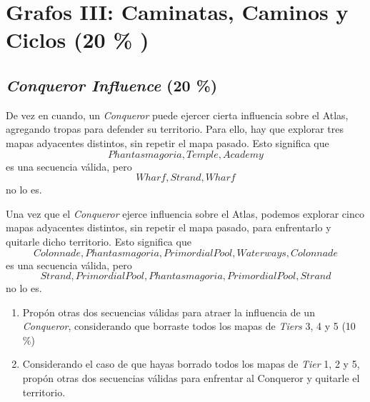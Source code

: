 \documentclass{article}
\begin{document}
\pagebreak

\section{Grafos III: Caminatas, Caminos y Ciclos (20 \% )}

\subsection{\textit{Conqueror Influence} (20 \%)}

De vez en cuando, un \textit{Conqueror} puede ejercer cierta influencia sobre el Atlas, agregando tropas para defender su territorio.
Para ello, hay que explorar tres mapas adyacentes distintos, sin repetir el mapa pasado. Esto significa que
$$Phantasmagoria, Temple, Academy$$
es una secuencia válida, pero
$$Wharf, Strand, Wharf$$
no lo es.

Una vez que el \textit{Conqueror} ejerce influencia sobre el Atlas, podemos explorar cinco mapas adyacentes distintos, sin repetir el mapa pasado, para enfrentarlo y quitarle dicho territorio. Esto significa que
$$Colonnade, Phantasmagoria, PrimordialPool, Waterways, Colonnade$$
es una secuencia válida, pero
$$Strand, PrimordialPool, Phantasmagoria, PrimordialPool, Strand$$ no lo es.

\begin{enumerate}[label=\tt \alph*)]
    \item Propón otras dos secuencias válidas para atraer la influencia de un \textit{Conqueror}, considerando que borraste todos los mapas de \textit{Tiers} 3, 4 y 5 (10 \%)
    \item Considerando el caso de que hayas borrado todos los mapas de \textit{Tier} 1, 2 y 5, propón otras dos secuencias válidas para enfrentar al Conqueror y quitarle el territorio.
\end{enumerate}






\end{document}
